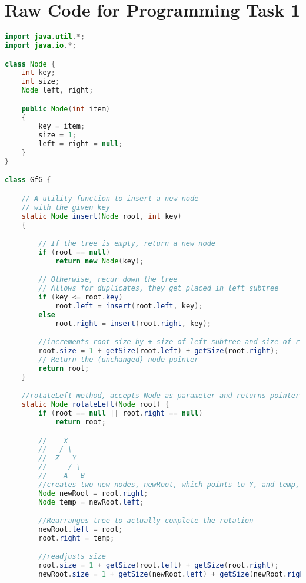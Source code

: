 \documentclass[11pt]{article}
\begin{document}
\pagebreak
\section*{Raw Code for Programming Task 1 }
\lstset{
    basicstyle=\ttfamily\footnotesize,
    breaklines=true,  %
    frame=single,     %
    numbers=left,     %
    tabsize=4,        %
    showstringspaces=false %
}
\begin{lstlisting}[language=Java]
import java.util.*;
import java.io.*;

class Node {
    int key;
    int size;
    Node left, right;

    public Node(int item)
    {
        key = item;
        size = 1;
        left = right = null;
    }
}

class GfG {

    // A utility function to insert a new node
    // with the given key
    static Node insert(Node root, int key)
    {

        // If the tree is empty, return a new node
        if (root == null)
            return new Node(key);

        // Otherwise, recur down the tree
        // Allows for duplicates, they get placed in left subtree
        if (key <= root.key)
            root.left = insert(root.left, key);
        else
            root.right = insert(root.right, key);

        //increments root size by + size of left subtree and size of right subtree
        root.size = 1 + getSize(root.left) + getSize(root.right);
        // Return the (unchanged) node pointer
        return root;
    }

    //rotateLeft method, accepts Node as parameter and returns pointer to new root after rotation
    static Node rotateLeft(Node root) {
        if (root == null || root.right == null)
            return root;

        //    X
        //   / \
        //  Z   Y
        //     / \
        //    A   B
        //creates two new nodes, newRoot, which points to Y, and temp, which points to A and will become X.right after rotation
        Node newRoot = root.right;
        Node temp = newRoot.left;

        //Rearranges tree to actually complete the rotation
        newRoot.left = root;
        root.right = temp;

        //readjusts size
        root.size = 1 + getSize(root.left) + getSize(root.right);
        newRoot.size = 1 + getSize(newRoot.left) + getSize(newRoot.right);



\end{lstlisting}
\end{document}
